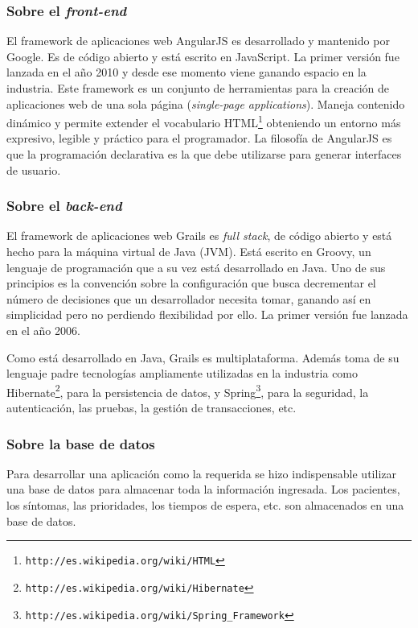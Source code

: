 \subsubsection{Sobre el \textit{front-end}}
El framework de aplicaciones web AngularJS es desarrollado y mantenido por Google. Es de código abierto y está escrito en JavaScript. La primer versión fue lanzada en el año 2010 y desde ese momento viene ganando espacio en la industria. Este framework es un conjunto de herramientas para la creación de aplicaciones web de una sola página (\textit{single-page applications}). Maneja contenido dinámico y permite extender el vocabulario HTML\footnote{\texttt{http://es.wikipedia.org/wiki/HTML}} obteniendo un entorno más expresivo, legible y práctico para el programador. La filosofía de AngularJS es que la programación declarativa es la que debe utilizarse para generar interfaces de usuario.

\subsubsection{Sobre el \textit{back-end}}
El framework de aplicaciones web Grails es \textit{full stack}, de código abierto y está hecho para la máquina virtual de Java (JVM). Está escrito en Groovy, un lenguaje de programación que a su vez está desarrollado en Java. Uno de sus principios es la convención sobre la configuración que busca decrementar el número de decisiones que un desarrollador necesita tomar, ganando así en simplicidad pero no perdiendo flexibilidad por ello. La primer versión fue lanzada en el año 2006.

Como está desarrollado en Java, Grails es multiplataforma. Además toma de su lenguaje padre tecnologías ampliamente utilizadas en la industria como Hibernate\footnote{\texttt{http://es.wikipedia.org/wiki/Hibernate}}, para la persistencia de datos, y Spring\footnote{\texttt{http://es.wikipedia.org/wiki/Spring\_Framework}}, para la seguridad, la autenticación, las pruebas, la gestión de transacciones, etc.

\subsubsection{Sobre la base de datos}
Para desarrollar una aplicación como la requerida se hizo indispensable utilizar una base de datos para almacenar toda la información ingresada. Los pacientes, los síntomas, las prioridades, los tiempos de espera, etc. son almacenados en una base de datos.

